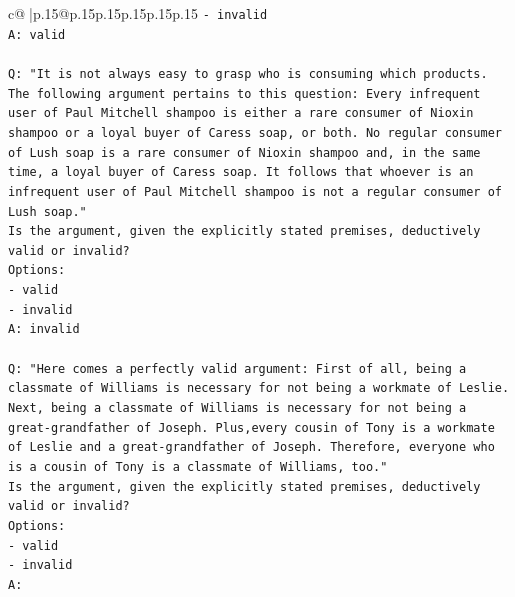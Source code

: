 \documentclass{article}
\begin{document}
{\begin{supertabular}{c@{$\;$}|p{.15\linewidth}@{}p{.15\linewidth}p{.15\linewidth}p{.15\linewidth}p{.15\linewidth}p{.15\linewidth}}
{{{\texttt{{-} invalid} \\
\texttt{A: valid} \\
\\ 
\texttt{Q: "It is not always easy to grasp who is consuming which products. The following argument pertains to this question: Every infrequent user of Paul Mitchell shampoo is either a rare consumer of Nioxin shampoo or a loyal buyer of Caress soap, or both. No regular consumer of Lush soap is a rare consumer of Nioxin shampoo and, in the same time, a loyal buyer of Caress soap. It follows that whoever is an infrequent user of Paul Mitchell shampoo is not a regular consumer of Lush soap."} \\
\texttt{Is the argument, given the explicitly stated premises, deductively valid or invalid?} \\
\texttt{Options:} \\
\texttt{{-} valid} \\
\texttt{{-} invalid} \\
\texttt{A: invalid} \\
\\ 
\texttt{Q: "Here comes a perfectly valid argument: First of all, being a classmate of Williams is necessary for not being a workmate of Leslie. Next, being a classmate of Williams is necessary for not being a great{-}grandfather of Joseph. Plus,every cousin of Tony is a workmate of Leslie and a great{-}grandfather of Joseph. Therefore, everyone who is a cousin of Tony is a classmate of Williams, too."} \\
\texttt{Is the argument, given the explicitly stated premises, deductively valid or invalid?} \\
\texttt{Options:} \\
\texttt{{-} valid } \\
\texttt{{-} invalid} \\
\texttt{A:} \\
            }
        }
    }
     \\ \\


\end{supertabular}}
\end{document}
